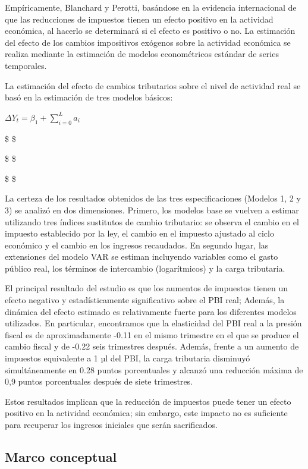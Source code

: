 \documentclass[
  letterpaper,
  DIV=11,
  numbers=noendperiod]{scrartcl}
\begin{document}
Empíricamente, Blanchard y Perotti, basándose en la evidencia
internacional de que las reducciones de impuestos tienen un efecto
positivo en la actividad económica, al hacerlo se determinará si el
efecto es positivo o no. La estimación del efecto de los cambios
impositivos exógenos sobre la actividad económica se realiza mediante la
estimación de modelos econométricos estándar de series temporales.

La estimación del efecto de cambios tributarios sobre el nivel de
actividad real se basó en la estimación de tres modelos básicos:

\(\Delta Y_t = \beta_{1} + \sum_{i=0}^{L} a_i\)

\$ \$

\$ \$

\$ \$

La certeza de los resultados obtenidos de las tres especificaciones
(Modelos 1, 2 y 3) se analizó en dos dimensiones. Primero, los modelos
base se vuelven a estimar utilizando tres índices sustitutos de cambio
tributario: se observa el cambio en el impuesto establecido por la ley,
el cambio en el impuesto ajustado al ciclo económico y el cambio en los
ingresos recaudados. En segundo lugar, las extensiones del modelo VAR se
estiman incluyendo variables como el gasto público real, los términos de
intercambio (logarítmicos) y la carga tributaria.

El principal resultado del estudio es que los aumentos de impuestos
tienen un efecto negativo y estadísticamente significativo sobre el PBI
real; Además, la dinámica del efecto estimado es relativamente fuerte
para los diferentes modelos utilizados. En particular, encontramos que
la elasticidad del PBI real a la presión fiscal es de aproximadamente
-0.11 en el mismo trimestre en el que se produce el cambio fiscal y de
-0.22 seis trimestres después. Además, frente a un aumento de impuestos
equivalente a 1 µl del PBI, la carga tributaria disminuyó
simultáneamente en 0.28 puntos porcentuales y alcanzó una reducción
máxima de 0,9 puntos porcentuales después de siete trimestres.

Estos resultados implican que la reducción de impuestos puede tener un
efecto positivo en la actividad económica; sin embargo, este impacto no
es suficiente para recuperar los ingresos iniciales que serán
sacrificados.

\hypertarget{sec-marco-conceptual}{%
\subsection{Marco conceptual}\label{sec-marco-conceptual}}
\end{document}
